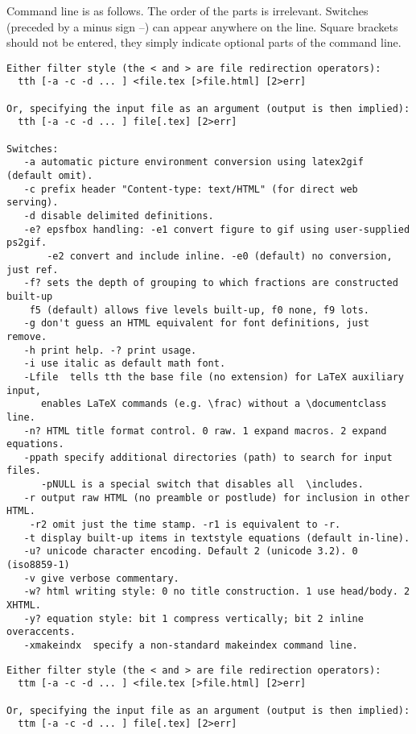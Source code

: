 \documentclass[12pt]{article}
\def\tthdump{}
\def\TtH{$\rm{}T_TH$}
\begin{document}
\index{switches!\TtH} Command line is as
follows. The order of the parts is irrelevant. Switches (preceded by a
minus sign --) can appear anywhere on the line. Square brackets should
not be entered, they simply indicate optional parts of the command
line.\label{n-switch}
 { \tthdump{\small}
\ifx\TtMgold\undefined
\begin{verbatim}
Either filter style (the < and > are file redirection operators):
  tth [-a -c -d ... ] <file.tex [>file.html] [2>err]

Or, specifying the input file as an argument (output is then implied):
  tth [-a -c -d ... ] file[.tex] [2>err]

Switches:
   -a automatic picture environment conversion using latex2gif (default omit). 
   -c prefix header "Content-type: text/HTML" (for direct web serving).
   -d disable delimited definitions.
   -e? epsfbox handling: -e1 convert figure to gif using user-supplied ps2gif.
       -e2 convert and include inline. -e0 (default) no conversion, just ref. 
   -f? sets the depth of grouping to which fractions are constructed built-up
    f5 (default) allows five levels built-up, f0 none, f9 lots. 
   -g don't guess an HTML equivalent for font definitions, just remove.
   -h print help. -? print usage.
   -i use italic as default math font.
   -Lfile  tells tth the base file (no extension) for LaTeX auxiliary input, 
      enables LaTeX commands (e.g. \frac) without a \documentclass line.
   -n? HTML title format control. 0 raw. 1 expand macros. 2 expand equations.
   -ppath specify additional directories (path) to search for input files.
      -pNULL is a special switch that disables all  \includes.
   -r output raw HTML (no preamble or postlude) for inclusion in other HTML.
	-r2 omit just the time stamp. -r1 is equivalent to -r.
   -t display built-up items in textstyle equations (default in-line).
   -u? unicode character encoding. Default 2 (unicode 3.2). 0 (iso8859-1)
   -v give verbose commentary. 
   -w? html writing style: 0 no title construction. 1 use head/body. 2 XHTML.
   -y? equation style: bit 1 compress vertically; bit 2 inline overaccents.
   -xmakeindx  specify a non-standard makeindex command line.
\end{verbatim}
\else
\begin{verbatim}
Either filter style (the < and > are file redirection operators):
  ttm [-a -c -d ... ] <file.tex [>file.html] [2>err]

Or, specifying the input file as an argument (output is then implied):
  ttm [-a -c -d ... ] file[.tex] [2>err]


\end{verbatim}}
\end{document}
